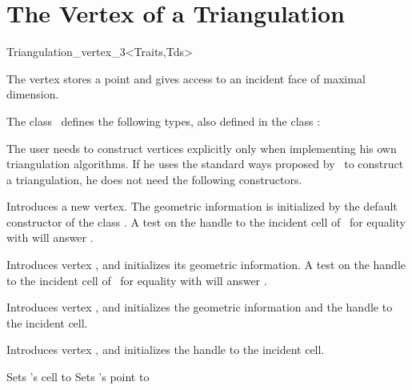 \section{The Vertex of a Triangulation} 
\label{Triangulation3-sec-class-Vertex}

\begin{ccClassTemplate}{Triangulation_vertex_3<Traits,Tds>}

\ccDefinition
The vertex stores a point and gives access to an incident face of
maximal dimension.



\ccTypes
{}
The class \ccClassTemplateName\ defines the following types, also
defined in the class :

\ccGlue
{}
\ccGlue
{}

\begin{ccAdvanced}
\ccCreation
The user needs to construct vertices explicitly only when implementing his
own triangulation algorithms. If he uses the standard ways proposed by 
\cgal\ to construct a triangulation, he does not need the following
constructors. 

{Introduces a new vertex. The geometric information is initialized by
the default constructor of the class . A test on the handle
to the incident cell of \ccVar\ for equality with  will
answer .} 

{Introduces vertex \ccVar, and initializes its geometric information.
A test on the handle
to the incident cell of \ccVar\ for equality with  will
answer .}

{Introduces vertex \ccVar, and initializes the geometric information and 
the handle to the incident cell.}

{Introduces vertex \ccVar, and initializes the handle to the incident cell.}

{Sets \ccVar's cell to }
{Sets \ccVar's point to }


\end{ccAdvanced}
\end{ccClassTemplate}
